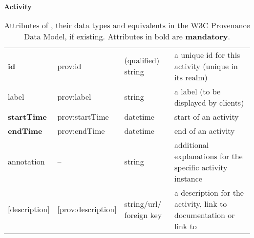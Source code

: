 \begin{table}[h]

\small
{}\textwidth

\textbf{\normalsize Activity}\vspace{0.25em}\\
\begin{tabulary}{1.0\textwidth}{@{}lp{2.5cm}p{2cm}L@{}}
\toprule
{} &  &  & \\
\midrule
\textbf{id} & prov:id  & (qualified) string & a unique id for this activity (unique in its realm)\\
label        & prov:label  & string & a label (to be displayed by clients)\\
\textbf{startTime} & prov:startTime & datetime & start of an activity\\
\textbf{endTime} & prov:endTime  & datetime & end of an activity\\
annotation        & --  & string & additional explanations for the specific activity instance\\
{[description]}  & [prov:description] & string/url/ foreign key & a description for the activity, 
				link to documentation or link to \\
\bottomrule
\end{tabulary}
\caption{Attributes of , their data types and equivalents in the W3C Provenance 
Data Model, if existing. Attributes in bold are \textbf{mandatory}.}
\end{table}


